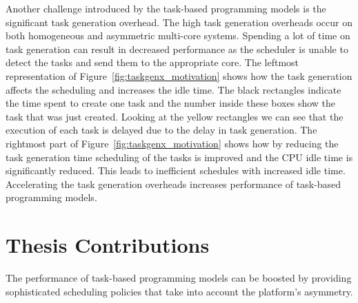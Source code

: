 Another challenge introduced by the task-based programming models is the significant task generation overhead.
The high task generation overheads occur on both homogeneous and asymmetric multi-core systems.
Spending a lot of time on task generation can result in decreased performance as the scheduler is unable to detect the tasks and send them to the appropriate core.
The leftmost representation of Figure~\ref{fig:taskgenx_motivation} shows how the task generation affects the scheduling and increases the idle time.
The black rectangles indicate the time spent to create one task and the number inside these boxes show the task that was just created.
Looking at the yellow rectangles we can see that the execution of each task is delayed due to the delay in task generation.
The rightmost part of Figure~\ref{fig:taskgenx_motivation} shows how by reducing the task generation time scheduling of the tasks is improved and the CPU idle time is significantly reduced.
This leads to inefficient schedules with increased idle time.
Accelerating the task generation overheads increases performance of task-based programming models.

\section{Thesis Contributions}


The performance of task-based programming models can be boosted by providing sophisticated scheduling policies that take into account the platform's asymmetry.

